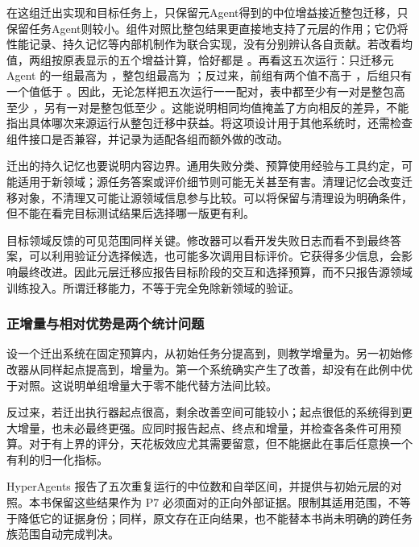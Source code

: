 在这组迁出实现和目标任务上，只保留元Agent得到的中位增益接近整包迁移，只保留任务Agent则较小。组件对照比整包结果更直接地支持了元层的作用；它仍将性能记录、持久记忆等内部机制作为联合实现，没有分别辨认各自贡献。若改看均值，两组按原表显示的五个增益计算，恰好都是 。再看这五次运行：只迁移元 Agent 的一组最高为 ，整包组最高为 ；反过来，前组有两个值不高于 ，后组只有一个值低于 \cite{hyperagents-2603-v2}。因此，无论怎样把五次运行一一配对，表中都至少有一对是整包高至少 ，另有一对是整包低至少 。这能说明相同均值掩盖了方向相反的差异，不能指出具体哪次来源运行从整包迁移中获益。将这项设计用于其他系统时，还需检查组件接口是否兼容，并记录为适配各组而额外做的改动。

迁出的持久记忆也要说明内容边界。通用失败分类、预算使用经验与工具约定，可能适用于新领域；源任务答案或评价细节则可能无关甚至有害。清理记忆会改变迁移对象，不清理又可能让源领域信息参与比较。可以将保留与清理设为明确条件，但不能在看完目标测试结果后选择哪一版更有利。

目标领域反馈的可见范围同样关键。修改器可以看开发失败日志而看不到最终答案，可以利用验证分选择候选，也可能多次调用目标评价。它获得多少信息，会影响最终改进。因此元层迁移应报告目标阶段的交互和选择预算，而不只报告源领域训练投入。所谓迁移能力，不等于完全免除新领域的验证。

\subsubsection{正增量与相对优势是两个统计问题}

\begin{sloppypar}
设一个迁出系统在固定预算内，从初始任务分提高到，则教学增量为。另一初始修改器从同样起点提高到，增量为。第一个系统确实产生了改善，却没有在此例中优于对照。这说明单组增量大于零不能代替方法间比较。
\end{sloppypar}

反过来，若迁出执行器起点很高，剩余改善空间可能较小；起点很低的系统得到更大增量，也未必最终更强。应同时报告起点、终点和增量，并检查各条件可用预算。对于有上界的评分，天花板效应尤其需要留意，但不能据此在事后任意换一个有利的归一化指标。

HyperAgents 报告了五次重复运行的中位数和自举区间，并提供与初始元层的对照\cite{hyperagents-2603}。本书保留这些结果作为 P7 必须面对的正向外部证据。限制其适用范围，不等于降低它的证据身份；同样，原文存在正向结果，也不能替本书尚未明确的跨任务族范围自动完成判决。

